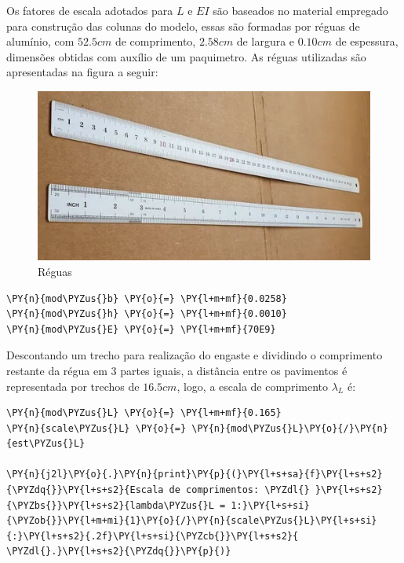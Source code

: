     Os fatores de escala adotados para \(L\) e \(EI\) são baseados no
material empregado para construção das colunas do modelo, essas são
formadas por réguas de alumínio, com \(52.5 cm\) de comprimento,
\(2.58 cm\) de largura e \(0.10 cm\) de espessura, dimensões obtidas com
auxílio de um paquimetro. As réguas utilizadas são apresentadas na
figura a seguir:

\begin{figure}
\centering
\includegraphics{../images/reguas.png}
\caption{Réguas}
\end{figure}

    \begin{tcolorbox}[breakable, size=fbox, boxrule=1pt, pad at break*=1mm,colback=cellbackground, colframe=cellborder]
\begin{Verbatim}[commandchars=\\\{\}]
\PY{n}{mod\PYZus{}b} \PY{o}{=} \PY{l+m+mf}{0.0258}
\PY{n}{mod\PYZus{}h} \PY{o}{=} \PY{l+m+mf}{0.0010}
\PY{n}{mod\PYZus{}E} \PY{o}{=} \PY{l+m+mf}{70E9}
\end{Verbatim}
\end{tcolorbox}

    Descontando um trecho para realização do engaste e dividindo o
comprimento restante da régua em 3 partes iguais, a distância entre os
pavimentos é representada por trechos de \(16.5 cm\), logo, a escala de
comprimento \(\lambda_L\) é:

    \begin{tcolorbox}[breakable, size=fbox, boxrule=1pt, pad at break*=1mm,colback=cellbackground, colframe=cellborder]
\begin{Verbatim}[commandchars=\\\{\}]
\PY{n}{mod\PYZus{}L} \PY{o}{=} \PY{l+m+mf}{0.165}
\PY{n}{scale\PYZus{}L} \PY{o}{=} \PY{n}{mod\PYZus{}L}\PY{o}{/}\PY{n}{est\PYZus{}L}

\PY{n}{j2l}\PY{o}{.}\PY{n}{print}\PY{p}{(}\PY{l+s+sa}{f}\PY{l+s+s2}{\PYZdq{}}\PY{l+s+s2}{Escala de comprimentos: \PYZdl{} }\PY{l+s+s2}{\PYZbs{}}\PY{l+s+s2}{lambda\PYZus{}L = 1:}\PY{l+s+si}{\PYZob{}}\PY{l+m+mi}{1}\PY{o}{/}\PY{n}{scale\PYZus{}L}\PY{l+s+si}{:}\PY{l+s+s2}{.2f}\PY{l+s+si}{\PYZcb{}}\PY{l+s+s2}{ \PYZdl{}.}\PY{l+s+s2}{\PYZdq{}}\PY{p}{)}
\end{Verbatim}
\end{tcolorbox}

